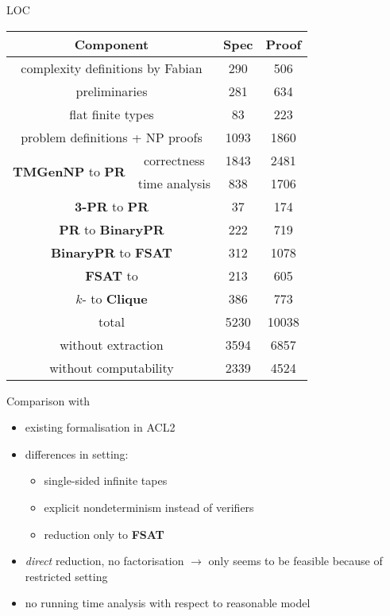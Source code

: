 \documentclass[11pt,usenames,dvipsnames,
hyperref={pdfencoding=auto,psdextra}]{beamer}
\newcommand*{\PR}{\textbf{PR}}
\newcommand*{\gennp}{\textbf{TMGenNP}}
\newcommand{\fsat}{\textbf{FSAT}}
\newcommand{\NP}{\textsf{NP}}
\newcommand{\Clique}{\normalfont\textbf{Clique}}
\begin{document}
\newcommand{\BPR}{\textbf{BinaryPR}}
\begin{frame}{LOC}
  \vspace{-2ex}
  \begin{center}
  \begin{tabular}{cccc}
    \multicolumn{2}{c}{Component} & Spec & Proof \\
    \midrule
    \multicolumn{2}{c}{complexity definitions by Fabian} & 290 & 506 \\
    \midrule
    \multicolumn{2}{c}{preliminaries} & 281 & 634 \\
    \multicolumn{2}{c}{flat finite types} & 83 & 223 \\
    \multicolumn{2}{c}{problem definitions + \NP{} proofs} & 1093 & 1860\\ 
    \midrule
    \multirow{2}{*}{\gennp{} to \PR{}} & correctness & 1843 & 2481\\
     & time analysis & 838 & 1706 \\
    \multicolumn{2}{c}{\textbf{3-PR} to \PR{}} & 37 & 174 \\
    \multicolumn{2}{c}{\PR{} to \BPR{}} & 222 & 719 \\ 
    \multicolumn{2}{c}{\BPR{} to \fsat{}} & 312& 1078\\ 
    \multicolumn{2}{c}{\fsat{} to \SAT{}} & 213 & 605 \\ 
    \midrule
    \multicolumn{2}{c}{$k$-\SAT{} to \Clique{}} & 386 & 773 \\
    \midrule
      \multicolumn{2}{c}{total} & 5230 & 10038 \\
      \multicolumn{2}{c}{without extraction} & 3594 & 6857 \\
      \multicolumn{2}{c}{without computability} & 2339 & 4524



  \end{tabular}
  \end{center}

\end{frame}

\begin{frame}[allowframebreaks]{Comparison with~\cite{gamboa:cook}}
  \begin{itemize}
    \item existing formalisation in ACL2 
    \item differences in setting: 
      \begin{itemize}
        \item single-sided infinite tapes 
        \item explicit nondeterminism instead of verifiers
        \item reduction only to \fsat{}
      \end{itemize}
    \item \emph{direct} reduction, no factorisation $\rightarrow$ only seems to be feasible because of restricted setting
    \item no running time analysis with respect to reasonable model
  \end{itemize}
\end{frame}
\end{document}
